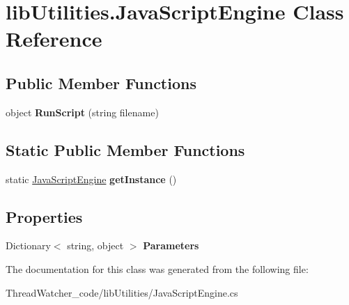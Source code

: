\hypertarget{classlib_utilities_1_1_java_script_engine}{\section{lib\+Utilities.\+Java\+Script\+Engine Class Reference}
\label{classlib_utilities_1_1_java_script_engine}
}
\subsection*{Public Member Functions}
\begin{DoxyCompactItemize}
\item 
\hypertarget{classlib_utilities_1_1_java_script_engine_ab658fd897fd4767331a3b8b1f47b986f}{object {\bfseries Run\+Script} (string filename)}\label{classlib_utilities_1_1_java_script_engine_ab658fd897fd4767331a3b8b1f47b986f}

\end{DoxyCompactItemize}
\subsection*{Static Public Member Functions}
\begin{DoxyCompactItemize}
\item 
\hypertarget{classlib_utilities_1_1_java_script_engine_ab59859e846a44b7fa81dbd6a4cd03ec4}{static \hyperlink{classlib_utilities_1_1_java_script_engine}{Java\+Script\+Engine} {\bfseries get\+Instance} ()}\label{classlib_utilities_1_1_java_script_engine_ab59859e846a44b7fa81dbd6a4cd03ec4}

\end{DoxyCompactItemize}
\subsection*{Properties}
\begin{DoxyCompactItemize}
\item 
\hypertarget{classlib_utilities_1_1_java_script_engine_ab8680e724eb0fbf8fc465dccd2a87a32}{Dictionary$<$ string, object $>$ {\bfseries Parameters}}\label{classlib_utilities_1_1_java_script_engine_ab8680e724eb0fbf8fc465dccd2a87a32}

\end{DoxyCompactItemize}


The documentation for this class was generated from the following file\+:\begin{DoxyCompactItemize}
\item 
Thread\+Watcher\+\_\+code/lib\+Utilities/Java\+Script\+Engine.\+cs\end{DoxyCompactItemize}
